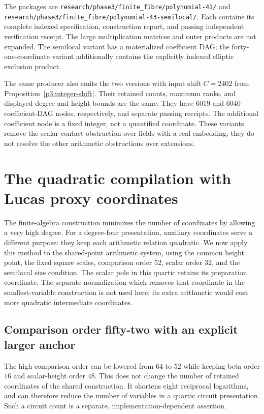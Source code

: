 \documentclass[11pt]{article}
\theoremstyle{definition}
\begin{document}
The packages are
\nolinkurl{research/phase3/finite_fibre/polynomial-41/} and
\nolinkurl{research/phase3/finite_fibre/polynomial-43-semilocal/}.
Each contains its complete indexed specification, construction
report, and passing independent verification receipt. The large
multiplication matrices and outer products are not expanded.
The semilocal variant has a materialized coefficient DAG; the
forty-one-coordinate variant additionally contains the explicitly
indexed elliptic exclusion product.

The same producer also emits the two versions with input shift
$C=2402$ from Proposition~\ref{p3:integer-shift}. Their retained
counts, maximum ranks, and displayed degree and height bounds
are the same. They have 6019 and 6040 coefficient-DAG nodes,
respectively, and separate passing receipts. The additional
coefficient node is a fixed integer, not a quantified coordinate.
These variants remove the scalar-contact obstruction over fields
with a real embedding; they do not resolve the other arithmetic
obstructions over extensions.



\section{The quadratic compilation with Lucas proxy coordinates}
\label{sec:new-quartic}

The finite-algebra construction minimizes the number of coordinates by
allowing a very high degree.  For a degree-four presentation, auxiliary
coordinates serve a different purpose: they keep each arithmetic relation
quadratic.  We now apply this method to the shared-point arithmetic system,
using the common height point, the fixed square scales, comparison order
$52$, scalar order $32$, and the semilocal size condition.  The scalar pole
in this quartic retains its preparation coordinate.  The separate
normalization which removes that coordinate in the smallest-variable
construction is not used here; its extra arithmetic would cost more
quadratic intermediate coordinates.

\subsection{Comparison order fifty-two with an explicit larger anchor}
\label{subsec:shared-precision52}

The high comparison order can be lowered from $64$ to $52$ while
keeping beta order $16$ and scalar-height order $48$.  This does not
change the number of retained coordinates of the shared construction.
It shortens eight reciprocal logarithms, and can therefore reduce the
number of variables in a quartic circuit presentation.  Such a circuit
count is a separate, implementation-dependent assertion.
\end{document}
